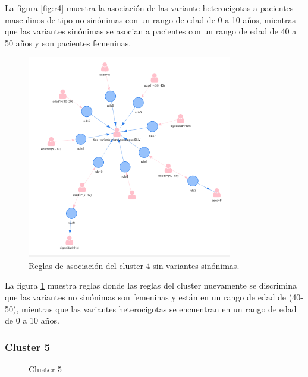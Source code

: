 La figura \ref{fig:r4} muestra la asociación de las variante heterocigotas a pacientes masculinos de tipo no sinónimas con un rango de edad de 0 a 10 años, mientras que las variantes sinónimas se asocian a pacientes con un rango de edad de 40 a 50 años y son pacientes femeninas. 

\begin{figure}[H]
	\centering
	\includegraphics[width=0.8\textwidth]{Kap4/reglas4_2}
	\caption{Reglas de asociación del cluster 4 sin variantes sinónimas.} \label{fig:re4}
\end{figure}

La figura \ref{fig:re4} muestra reglas  donde las reglas del cluster nuevamente se discrimina que las variantes no sinónimas son femeninas y están en un rango de edad de (40-50), mientras que las variantes heterocigotas se encuentran en un rango de edad de 0 a 10 años. 

\subsubsection*{Cluster 5}

\begin{figure}[H]
	\centering
	\caption{Cluster 5} \label{fig:c5}
\end{figure}

